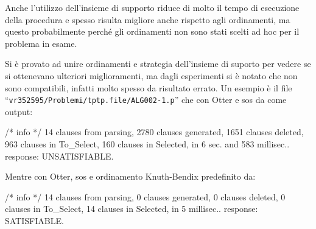 \documentclass[a4paper,11pt]{article} %
\newcommand{\file}{\texttt}
\newcommand{\campo}{\texttt}
\begin{document}
Anche l'utilizzo dell'insieme di supporto riduce di molto il tempo di esecuzione
della procedura%
 e spesso risulta migliore anche rispetto agli ordinamenti,
ma questo probabilmente perché gli ordinamenti non sono stati scelti ad hoc per il
problema in esame. 

Si è provato ad unire ordinamenti e strategia dell'insieme di suporto per vedere
se si ottenevano ulteriori miglioramenti, ma dagli esperimenti si è notato che 
non sono compatibili, infatti molto spesso da risultato errato.  
Un esempio è il file ``\file{vr352595/Problemi/tptp.file/ALG002-1.p}'' che con Otter e
sos da come output:
\scriptsize
\vspace{-1ex}
\begin{shell}
/* info */
14 clauses from parsing, 
2780 clauses generated, 
1651 clauses deleted, 
963 clauses in To_Select, 
160 clauses in Selected, 
in 6 sec. and 583 millisec..
response: UNSATISFIABLE.
\end{shell}
\normalsize
Mentre con Otter, sos e ordinamento Knuth-Bendix predefinito da:
\scriptsize
\vspace{-1ex}
\begin{shell}
/* info */
14 clauses from parsing, 
0 clauses generated, 
0 clauses deleted, 
0 clauses in To_Select, 
14 clauses in Selected, 
in 5 millisec..
response: SATISFIABLE.
\end{shell}
\normalsize
%
\end{document}
